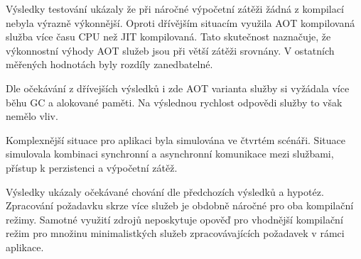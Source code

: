
Výsledky testování ukázaly že při náročné výpočetní zátěži žádná z kompilací nebyla výrazně výkonnější. Oproti dřívějším situacím využila AOT kompilovaná služba více času CPU než JIT kompilovaná. Tato skutečnost naznačuje, že výkonnostní výhody AOT služeb jsou při větší zátěži srovnány. V ostatních měřených hodnotách byly rozdíly zanedbatelné. 


Dle očekávání z dřívejších výsledků i zde AOT varianta služby si vyžádala více běhu GC a alokované paměti. Na výslednou rychlost odpovědi služby to však nemělo vliv.


Komplexnější situace pro aplikaci byla simulována ve čtvrtém scénáři. Situace simulovala kombinaci synchronní a asynchronní komunikace mezi službami, přístup k perzistenci a výpočetní zátěž. 


Výsledky ukázaly očekávané chování dle předchozích výsledků a hypotéz. Zpracování požadavku skrze více služeb je obdobně náročné pro oba kompilační režimy. Samotné využití zdrojů neposkytuje opověď pro vhodnější kompilační režim pro množinu minimalistkých služeb zpracovávajících požadavek v rámci aplikace.

